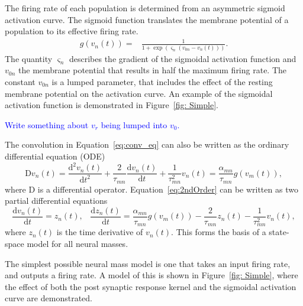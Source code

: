 \documentclass{article}%
\newcommand{\dean}[1]{\textcolor{blue}{#1}}
\begin{document}
The firing rate of each population is determined from an asymmetric sigmoid activation curve. The sigmoid function translates the membrane potential of a population to its effective firing rate.
\begin{align}\label{eq:sigmoid}
    g\left(v_n(t)\right) =& \frac{1}{1+\exp{\left(\varsigma_n\left(v_{0n} - v_n(t)\right)\right)}}.
\end{align}
The quantity $\varsigma_n$ describes the gradient of the sigmoidal activation function and $v_{0n}$ the membrane potential that results in half the maximum firing rate. The constant $v_{0n}$ is a lumped parameter, that includes the effect of the resting membrane potential on the activation curve. An example of the sigmoidal activation function is demonstrated in Figure~\ref{fig: Simple}.

 \dean{Write something about $v_r$ being lumped into $v_0$.}

The convolution in Equation~\ref{eq:conv_eq} can also be written as the ordinary differential equation (ODE)
\begin{equation}\label{eq:2ndOrder}
    \mathrm{D}v_n(t) = \frac{\mathrm{d}^2 v_n(t)}{\mathrm{d}t^2} + \frac{2}{\tau_{mn}}\frac{\mathrm{d} v_n(t)}{\mathrm{d}t} + \frac{1}{\tau_{mn}^2} v_n(t) = \frac{\alpha_{mn}}{\tau_{mn}} g(v_m(t)),
\end{equation}
where $\mathrm{D}$ is a differential operator. Equation~\ref{eq:2ndOrder} can be written as two partial differential equations
\begin{equation} \label{eq:2ndOrderNMM}
    \frac{\mathrm{d} v_n(t)}{\mathrm{d}t} = z_n(t),\,\,\,\,\,    \frac{\mathrm{d}z_n(t)}{\mathrm{d}t} = \frac{\alpha_{mn}}{\tau_{mn}} g(v_m(t)) - \frac{2}{\tau_{mn}}z_n(t) - \frac{1}{\tau_{mn}^2} v_n(t),
\end{equation}
where $z_n(t)$ is the time derivative of $v_n(t)$. This forms the basis of a state-space model for all neural masses.

The simplest possible neural mass model is one that takes an input firing rate, and outputs a firing rate. A model of this is shown in Figure~\ref{fig: Simple}, where the effect of both the post synaptic response kernel and the sigmoidal activation curve are demonstrated.
\end{document}

